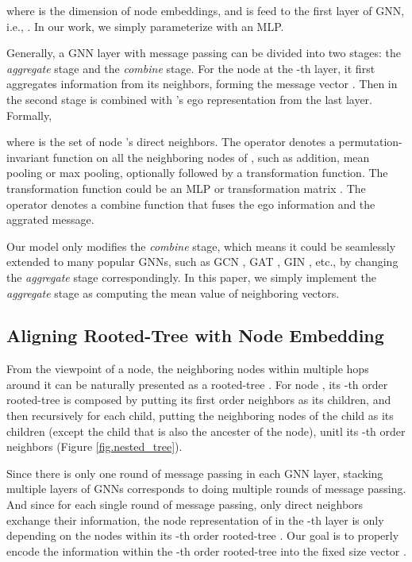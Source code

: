 \documentclass{article}
\begin{document}
where  is the dimension of node embeddings, and  is feed to the first layer of GNN, i.e., . In our work, we simply parameterize  with an MLP. 


Generally, a GNN layer with message passing can be divided into two stages: the \textit{aggregate} stage and the \textit{combine} stage. For the node  at the -th layer, it first aggregates information from its neighbors, forming the message vector . Then in the second stage  is combined with 's ego representation  from the last layer. Formally,

where  is the set of node 's direct neighbors. The  operator denotes a permutation-invariant function on all the neighboring nodes of , such as addition, mean pooling or max pooling, optionally followed by a transformation function. The transformation function could be an MLP \citep{xu2018powerful} or transformation matrix \citep{kipf2016semi}. The  operator denotes a combine function that fuses the ego information and the aggrated message. 

Our model only modifies the \textit{combine} stage, which means it could be seamlessly extended to many popular GNNs, such as GCN \citep{kipf2016semi}, GAT \citep{velivckovic2017graph}, GIN \citep{xu2018powerful}, etc., by changing the \textit{aggregate} stage correspondingly. In this paper, we simply implement the \textit{aggregate} stage as computing the mean value of neighboring vectors.


\subsection{Aligning Rooted-Tree with Node Embedding}
\label{align_rooted_tree}
From the viewpoint of a node, the neighboring nodes within multiple hops around it can be naturally presented as a rooted-tree \citep{xu2018powerful,xu2018representation,liu2020towards}. For node , its -th order rooted-tree  is composed by putting its first order neighbors as its children, and then recursively for each child, putting the neighboring nodes of the child as its children (except the child that is also the ancester of the node), unitl its -th order neighbors (Figure \ref{fig.nested_tree}). 

Since there is only one round of message passing in each GNN layer, stacking multiple layers of GNNs corresponds to doing multiple rounds of message passing. And since for each single round of message passing, only direct neighbors exchange their information, the node representation of  in the -th layer  is only depending on the nodes within its -th order rooted-tree . Our goal is to properly encode the information within the -th order rooted-tree into the fixed size vector . 
\end{document}
